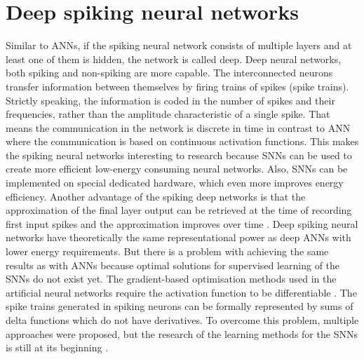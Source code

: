 \section{Deep spiking neural networks}
Similar to ANNs, if the spiking neural network consists of multiple layers and at least one of them is hidden, the network is called deep. Deep neural networks, both spiking and non-spiking are more capable. The interconnected neurons transfer information between themselves by firing trains of spikes (spike trains). Strictly speaking, the information is coded in the number of spikes and their frequencies, rather than the amplitude characteristic of a single spike. That means the communication in the network is discrete in time in contrast to ANN where the communication is based on continuous activation functions. This makes the spiking neural networks interesting to research because SNNs can be used to create more efficient low-energy consuming neural networks. Also, SNNs can be implemented on special dedicated hardware, which even more improves energy efficiency. Another advantage of the spiking deep networks is that the approximation of the final layer output can be retrieved at the time of recording first input spikes and the approximation improves over time \cite{pfeifferDeepLearningSpiking2018}.
Deep spiking neural networks have theoretically the same representational power as deep ANNs with lower energy requirements. But there is a problem with achieving the same results as with ANNs because optimal solutions for supervised learning of the SNNs do not exist yet. The gradient-based optimisation methods used in the artificial neural networks require the activation function to be differentiable \cite{tavanaeiDeepLearningSpiking2019}. The spike trains generated in spiking neurons can be formally represented by sums of delta functions which do not have derivatives. To overcome this problem, multiple approaches were proposed, but the research of the learning methods for the SNNs is still at its beginning \cite{tavanaeiDeepLearningSpiking2019}. 

